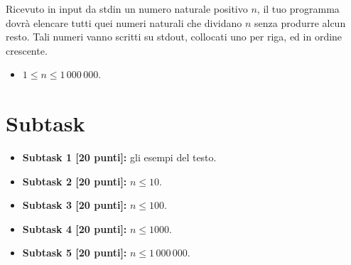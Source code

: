 \renewcommand{\nomebreve}{list\_divisors}
\renewcommand{\titolo}{Elencare i divisori di un numero}

\introduzione{}

Ricevuto in input da stdin un numero naturale positivo $n$,
il tuo programma dovrà elencare tutti quei numeri naturali che dividano $n$ senza produrre alcun resto. Tali numeri vanno scritti su stdout, collocati uno per riga, ed in ordine crescente.




\begin{itemize}[nolistsep, noitemsep]
  \item $1 \le n \le 1\,000\,000$.
\end{itemize}
  
  \section*{Subtask}
  \begin{itemize}
    \item \textbf{Subtask 1 [20 punti]:} gli esempi del testo.
    \item \textbf{Subtask 2 [20 punti]:} $n\leq 10$.
    \item \textbf{Subtask 3 [20 punti]:} $n\leq 100$.
    \item \textbf{Subtask 4 [20 punti]:} $n\leq 1000$.
    \item \textbf{Subtask 5 [20 punti]:} $n\leq 1\,000\,000$.
  \end{itemize}
  
